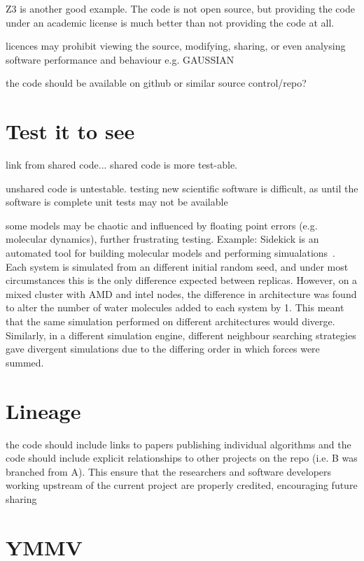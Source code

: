\documentclass[conference]{IEEEtran}
\begin{document}
Z3 is another good example. The code is not open source, but providing
the code under an academic license is much better than not providing
the code at all.

licences may prohibit viewing the source, modifying, sharing, or even
analysing software performance and behaviour e.g. GAUSSIAN~\cite{Giles2004}

the code should be available on github or similar source control/repo?

\section{Test it to see}
link from shared code... shared code is more test-able. 

unshared code is untestable.  testing new scientific software is
difficult, as until the software is complete unit tests may not be
available

some models may be chaotic and influenced by floating point errors
(e.g. molecular dynamics), further frustrating testing. Example:
Sidekick is an automated tool for building molecular models and
performing simualations~\cite{Hall2014Sidekick}. Each system is
simulated from an different initial random seed, and under most
circumstances this is the only difference expected between
replicas. However, on a mixed cluster with AMD and intel nodes, the
difference in architecture was found to alter the number of water
molecules added to each system by 1. This meant that the same
simulation performed on different architectures would
diverge. Similarly, in a different simulation engine, different
neighbour searching strategies gave divergent simulations due to the
differing order in which forces were summed.



\section{Lineage} 

the code should include links to papers publishing individual
algorithms and the code should include explicit relationships to other
projects on the repo (i.e. B was branched from A). This ensure that
the researchers and software developers working upstream of the
current project are properly credited, encouraging future sharing


\section{YMMV}
\end{document}
